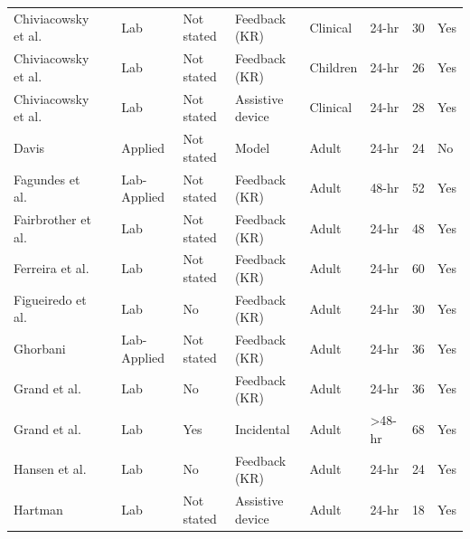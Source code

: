 \documentclass[man,floatsintext,hidelinks]{apa7}
\begin{document}
\begin{landscape}
\begin{longtable}[l]{lllllllll}
Chiviacowsky et al.   & \citeyear{Chiviacowsky2012-pk}          & Lab         & Not stated   & Feedback (KR)         & Clinical     & 24-hr              & 30  & Yes       \\
Chiviacowsky et al.   & \citeyear{Chiviacowsky2008-bj}          & Lab         & Not stated   & Feedback (KR)         & Children     & 24-hr              & 26  & Yes       \\
Chiviacowsky et al.   & \citeyear{Chiviacowsky2012-ri}          & Lab         & Not stated   & Assistive device      & Clinical     & 24-hr              & 28  & Yes       \\
Davis                 & \citeyear{davis2009-dt}          & Applied     & Not stated   & Model                 & Adult        & 24-hr              & 24  & No        \\
Fagundes et al.       & \citeyear{Fagundes2013-ge}          & Lab-Applied & Not stated   & Feedback (KR)         & Adult        & 48-hr              & 52  & Yes       \\
Fairbrother et al.    & \citeyear{Fairbrother2012-gz}          & Lab         & Not stated   & Feedback (KR)         & Adult        & 24-hr              & 48  & Yes       \\
Ferreira et al.       & \citeyear{Ferreira2019-zo}          & Lab         & Not stated   & Feedback (KR)         & Adult        & 24-hr              & 60  & Yes       \\
Figueiredo et al.     & \citeyear{Figueiredo2018-kw}          & Lab         & No           & Feedback (KR)         & Adult        & 24-hr              & 30  & Yes       \\
Ghorbani              & \citeyear[Exp 2]{Ghorbani2019-yz}   & Lab-Applied & Not stated   & Feedback (KR)         & Adult        & 24-hr              & 36  & Yes       \\
Grand et al.          & \citeyear{Grand2015-de}           & Lab         & No           & Feedback (KR)         & Adult        & 24-hr              & 36  & Yes       \\
Grand et al.          & \citeyear{Grand2017-de}          & Lab         & Yes          & Incidental            & Adult        & \textgreater 48-hr & 68  & Yes       \\
Hansen et al.         & \citeyear{Hansen2011-rr}           & Lab         & No           & Feedback (KR)         & Adult        & 24-hr              & 24  & Yes       \\
Hartman               & \citeyear{Hartman2007-uv}           & Lab         & Not stated   & Assistive device      & Adult        & 24-hr              & 18  & Yes       \\

\end{longtable}
\end{landscape}
\end{document}
